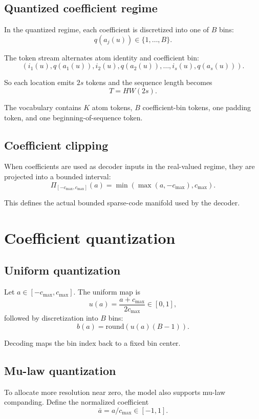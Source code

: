 \documentclass[11pt]{article}
\begin{document}
\subsection{Quantized coefficient regime}

In the quantized regime, each coefficient is discretized into one of $B$ bins:
\[
q(a_j(u)) \in \{1,\dots,B\}.
\]

The token stream alternates atom identity and coefficient bin:
\[
(i_1(u), q(a_1(u)), i_2(u), q(a_2(u)), \dots, i_s(u), q(a_s(u))).
\]

So each location emits $2s$ tokens and the sequence length becomes
\[
T = H W (2s).
\]

The vocabulary contains $K$ atom tokens, $B$ coefficient-bin tokens, one padding token, and one beginning-of-sequence token.

\subsection{Coefficient clipping}

When coefficients are used as decoder inputs in the real-valued regime, they are projected into a bounded interval:
\[
\Pi_{[-c_{\max}, c_{\max}]}(a) = \min(\max(a,-c_{\max}), c_{\max}).
\]

This defines the actual bounded sparse-code manifold used by the decoder.

\section{Coefficient quantization}

\subsection{Uniform quantization}

Let $a \in [-c_{\max}, c_{\max}]$. The uniform map is
\[
u(a) = \frac{a + c_{\max}}{2c_{\max}} \in [0,1],
\]
followed by discretization into $B$ bins:
\[
b(a) = \mathrm{round}\left(u(a)(B-1)\right).
\]

Decoding maps the bin index back to a fixed bin center.

\subsection{Mu-law quantization}

To allocate more resolution near zero, the model also supports mu-law companding. Define the normalized coefficient
\[
\bar a = a / c_{\max} \in [-1,1].
\]
\end{document}
